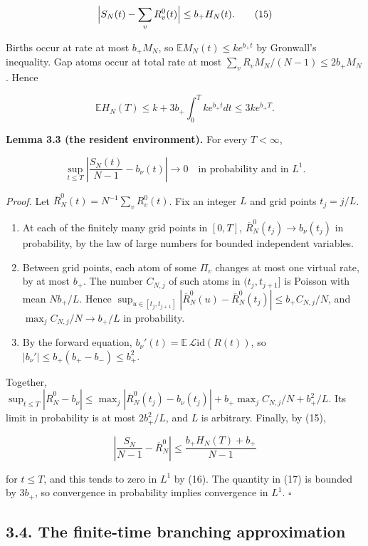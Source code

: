 \documentclass[
  british,
  11pt,
  a4paper,
]{article}
\providecommand{\tightlist}{%
  \setlength{\itemsep}{0pt}\setlength{\parskip}{0pt}}
\begin{document}
\[
\Bigl|S_N(t)-\sum_vR^0_v(t)\Bigr|\le b_+H_N(t).
\tag{15}
\]

Births occur at rate at most \(b_+M_N\), so
\(\mathbb EM_N(t)\le ke^{b_+t}\) by Gronwall's inequality. Gap atoms
occur at total rate at most \(\sum_vR_vM_N/(N-1)\le2b_+M_N\). Hence

\[
\mathbb EH_N(T)\le k+3b_+\int_0^T ke^{b_+t}dt\le3ke^{b_+T}.
\tag{16}
\]

\textbf{Lemma 3.3 (the resident environment).} For every \(T<\infty\),

\[
\sup_{t\le T}\left|\frac{S_N(t)}{N-1}-b_\nu(t)\right|\longrightarrow0
\quad\text{in probability and in }L^1.
\tag{17}
\]

\emph{Proof.} Let \(\overline R^0_N(t)=N^{-1}\sum_vR^0_v(t)\). Fix an
integer \(L\) and grid points \(t_j=j/L\).

\begin{enumerate}
\def\labelenumi{\arabic{enumi}.}
\tightlist
\item
  At each of the finitely many grid points in \([0,T]\),
  \(\overline R^0_N(t_j)\to b_\nu(t_j)\) in probability, by the law of
  large numbers for bounded independent variables.
\item
  Between grid points, each atom of some \(\Pi_v\) changes at most one
  virtual rate, by at most \(b_+\). The number \(C_{N,j}\) of such atoms
  in \((t_j,t_{j+1}]\) is Poisson with mean \(Nb_+/L\). Hence
  \(\sup_{u\in[t_j,t_{j+1}]}|\overline R^0_N(u)-\overline R^0_N(t_j)|\le b_+C_{N,j}/N\),
  and \(\max_jC_{N,j}/N\to b_+/L\) in probability.
\item
  By the forward equation,
  \(b_\nu'(t)=\mathbb E\,\mathcal L\mathrm{id}(R(t))\), so
  \(|b_\nu'|\le b_+(b_+-b_-)\le b_+^2\).
\end{enumerate}

Together,
\(\sup_{t\le T}|\overline R^0_N-b_\nu|\le\max_j|\overline R^0_N(t_j)-b_\nu(t_j)|+b_+\max_jC_{N,j}/N+b_+^2/L\).
Its limit in probability is at most \(2b_+^2/L\), and \(L\) is
arbitrary. Finally, by (15),

\[
\left|\frac{S_N}{N-1}-\overline R^0_N\right|\le\frac{b_+H_N(T)+b_+}{N-1}
\]

for \(t\le T\), and this tends to zero in \(L^1\) by (16). The quantity
in (17) is bounded by \(3b_+\), so convergence in probability implies
convergence in \(L^1\). \(\square\)

\subsection{3.4. The finite-time branching
approximation}\label{the-finite-time-branching-approximation}
\end{document}
